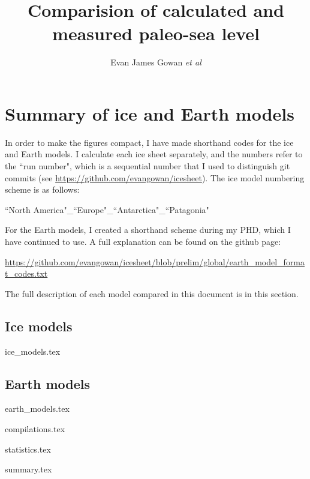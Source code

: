 \documentclass[a4paper,12pt]{article}
\begin{document}
\title{Comparision of calculated and measured paleo-sea level}

\author{Evan James Gowan \emph{et al}}
    
\date{}

\maketitle

\tableofcontents

\newpage

\section{Summary of ice and Earth models}


In order to make the figures compact, I have made shorthand codes for the ice and Earth models. I calculate each ice sheet separately, and the numbers refer to the ``run number", which is a sequential number that I used to distinguish git commits (see \url{https://github.com/evangowan/icesheet}). The ice model numbering scheme is as follows:

``North America"\_``Europe"\_``Antarctica"\_``Patagonia"

For the Earth models, I created a shorthand scheme during my PHD, which I have continued to use. A full explanation can be found on the github page:

\url{https://github.com/evangowan/icesheet/blob/prelim/global/earth_model_format_codes.txt} %

The full description of each model compared in this document is in this section.



\subsection{Ice models}

{ice_models.tex}

\subsection{Earth models}

{earth_models.tex}

\newpage


{compilations.tex}

\newpage

{statistics.tex}


\newpage

{summary.tex}

\clearpage

\newpage



\end{document}
